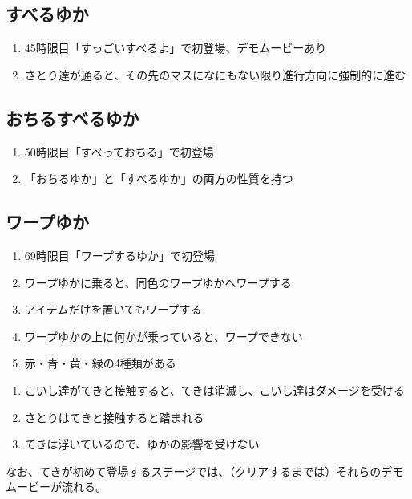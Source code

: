 \subsection{すべるゆか}
\begin{enumerate}[label={\sarrow}]
\item 45時限目「すっごいすべるよ」で初登場、デモムービーあり
\item さとり達が通ると、その先のマスになにもない限り進行方向に強制的に進む
\end{enumerate}


\subsection{おちるすべるゆか}
\begin{enumerate}[label={\sarrow}]
\item 50時限目「すべっておちる」で初登場
\item 「おちるゆか」と「すべるゆか」の両方の性質を持つ
\end{enumerate}


\clearpage
\subsection{ワープゆか}
\begin{enumerate}[label={\sarrow}]
\item 69時限目「ワープするゆか」で初登場
\item ワープゆかに乗ると、同色のワープゆかへワープする
\item アイテムだけを置いてもワープする
\item ワープゆかの上に何かが乗っていると、ワープできない
\item 赤・青・黄・緑の4種類がある
\end{enumerate}


\clearpage
\begin{enumerate}[label={\sarrow}]
\item こいし達がてきと接触すると、てきは消滅し、こいし達はダメージを受ける
\item さとりはてきと接触すると踏まれる
\item てきは浮いているので、ゆかの影響を受けない
\end{enumerate}
なお、てきが初めて登場するステージでは、（クリアするまでは）それらのデモムービーが流れる。



